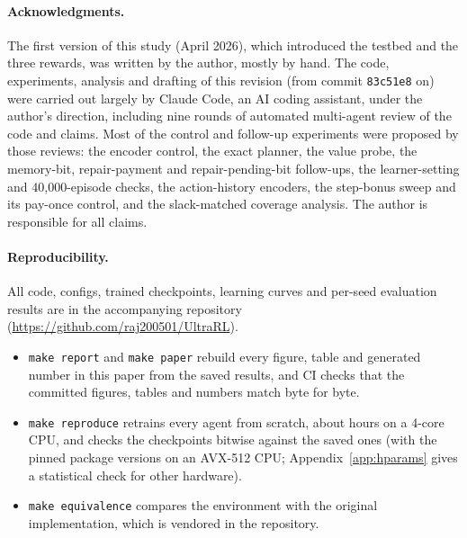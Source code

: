 \paragraph{Acknowledgments.}
The first version of this study (April 2026), which introduced the testbed and the three rewards, was written by the author, mostly by hand. The code, experiments, analysis and drafting of this revision (from commit \texttt{83c51e8} on) were carried out largely by Claude Code, an AI coding assistant, under the author's direction, including nine rounds of automated multi-agent review of the code and claims. Most of the control and follow-up experiments were proposed by those reviews: the encoder control, the exact planner, the value probe, the memory-bit, repair-payment and repair-pending-bit follow-ups, the learner-setting and 40{,}000-episode checks, the action-history encoders, the step-bonus sweep and its pay-once control, and the slack-matched coverage analysis. The author is responsible for all claims.

\paragraph{Reproducibility.}
All code, configs, trained checkpoints, learning curves and per-seed evaluation results are in the accompanying repository (\url{https://github.com/raj200501/UltraRL}).
\begin{itemize}
  \item \texttt{make report} and \texttt{make paper} rebuild every figure, table and generated number in this paper from the saved results, and CI checks that the committed figures, tables and numbers match byte for byte.
  \item \texttt{make reproduce} retrains every agent from scratch, about  hours on a 4-core CPU, and checks the checkpoints bitwise against the saved ones (with the pinned package versions on an AVX-512 CPU; Appendix~\ref{app:hparams} gives a statistical check for other hardware).
  \item \texttt{make equivalence} compares the environment with the original implementation, which is vendored in the repository.
\end{itemize}
